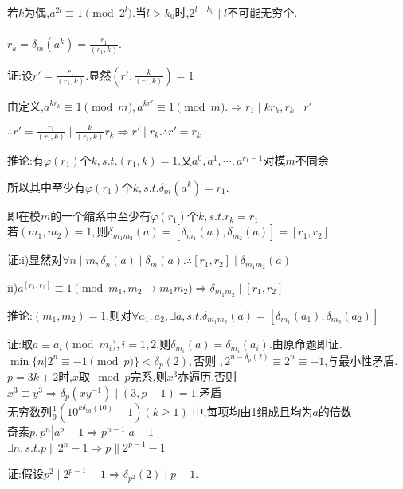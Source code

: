 若$ k$为偶,$ a^{2l}\equiv 1 \pmod{2^l}.$当$ l>k_0$时,$ 2^{l-k_0}\mid l$不可能无穷个.
\\
\\
$ r_k=\delta_m(a^k)=\frac{r_1}{(r_1,k)}$.

证:设$ r'=\frac{r_1}{(r_1,k)}$.显然$ (r',\frac{k}{(r_1,k)})=1$

由定义,$ a^{kr_k}\equiv 1 \pmod m, a^{kr'}\equiv 1 \pmod m. \Rightarrow  r_1 \mid kr_k,r_k\mid r'$

$ \therefore r' =\frac{r_1}{(r_1,k)}\mid \frac{k}{(r_1,k)}r_k\Rightarrow r' \mid r_k. \therefore r'=r_k$

推论:有$ \varphi(r_1)$个$ k,s.t.(r_1,k)=1.$又$ a^0,a^1,\cdots,a^{r_1-1}$对模$ m$不同余

所以其中至少有$ \varphi(r_1)$个$ k,s.t.\delta_m(a^k)=r_1$.

即在模$ m$的一个缩系中至少有$ \varphi(r_1)$个$ k,s.t.r_k=r_1$
\\

若$ (m_1,m_2)=1,$则$ \delta_{m_1m_2}(a)=[\delta_{m_1}(a),\delta_{m_2}(a)]=[r_1,r_2]$

证:i)显然对$ \forall n \mid m,\delta_n(a)\mid \delta_m(a). \therefore [r_1,r_2] \mid \delta_{m_1m_2}(a)$ 

ii)$ a^{[r_1,r_2]}\equiv 1 \pmod{m_1,m_2 \rightarrow m_1m_2}\Rightarrow \delta_{m_1m_2}\mid [r_1,r_2]$

推论:$ (m_1,m_2)=1$,则对$ \forall a_1,a_2,\exists a,s.t.\delta_{m_1m_2}(a)=[\delta_{m_1}(a_1),\delta_{m_2}(a_2)]$

证:取$ a\equiv a_i \pmod{m_i},i=1,2$.则$ \delta_{m_i}(a)=\delta_{m_i}(a_i)$.由原命题即证.
\\

$ \min\{ n|2^n\equiv -1 \pmod p\}<\delta_p(2),$否则 $,2^{n-\delta_p(2)}\equiv 2^n \equiv -1$,与最小性矛盾.
\\

$ p=3k+2$时,$ x$取$ \mod p$完系,则$ x^3$亦遍历.否则$ x^3\equiv y^3\Rightarrow \delta_p(xy^{-1})\mid(3,p-1)=1$.矛盾
\\

无穷数列$  \frac{1}{9}(10^{k\delta_{9a}(10)}-1)(k\ge1) $ 中,每项均由1组成且均为$ a$的倍数
\\

奇素$ p,p^n|a^p-1\Rightarrow p^{n-1}|a-1$
\\

$ \exists n,s.t.p\parallel2^n-1\Rightarrow p\parallel 2^{p-1}-1$

证:假设$ p^2 \mid 2^{p-1}-1\Rightarrow \delta_{p^2}(2)\mid p-1.$

